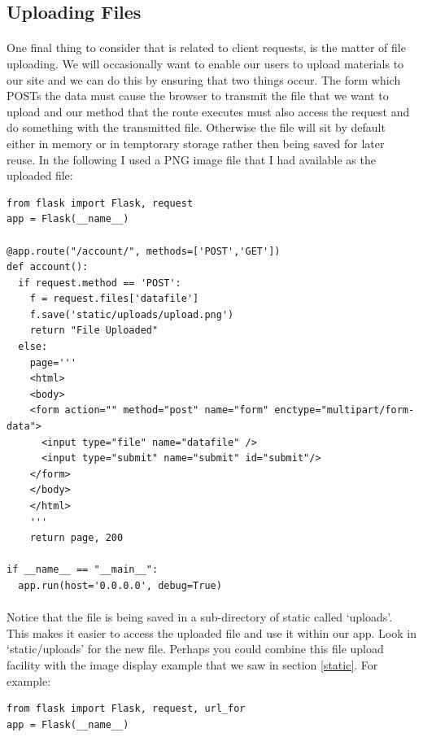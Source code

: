 \documentclass[12pt, a4paper, oneside]{book}
\begin{document}
{\subsection{Uploading Files}
\label{file-uploading}
\paragraph{} One final thing to consider that is related to client requests, is the matter of file uploading. We will occasionally want to enable our users to upload materials to our site and we can do this by ensuring that two things occur. The form which POSTs the data must cause the browser to transmit the file that we want to upload and our method that the route executes must also access the request and do something with the transmitted file. Otherwise the file will sit by default either in memory or in temptorary storage rather then being saved for later reuse. In the following I used a PNG image file that I had available as the uploaded file:

\begin{lstlisting}
from flask import Flask, request
app = Flask(__name__)

@app.route("/account/", methods=['POST','GET'])
def account():
  if request.method == 'POST':
    f = request.files['datafile']
    f.save('static/uploads/upload.png')
    return "File Uploaded"
  else:
    page='''
    <html>
    <body>
    <form action="" method="post" name="form" enctype="multipart/form-data">
      <input type="file" name="datafile" />
      <input type="submit" name="submit" id="submit"/>
    </form>
    </body>
    </html>
    '''
    return page, 200

if __name__ == "__main__":
  app.run(host='0.0.0.0', debug=True)
\end{lstlisting}

\paragraph{} Notice that the file is being saved in a sub-directory of static called `uploads'. This makes it easier to access the uploaded file and use it within our app. Look in `static/uploads' for the new file. Perhaps you could combine this file upload facility with the image display example that we saw in section \ref{static}. For example:

\begin{lstlisting}
from flask import Flask, request, url_for
app = Flask(__name__)


\end{lstlisting}}
\end{document}
